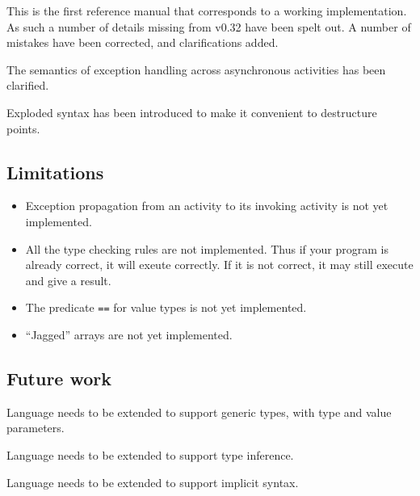 
This is the first reference manual that corresponds to a working
implementation. As such a number of details missing from v0.32 have
been spelt out. A number of mistakes have been corrected, and
clarifications added.

The semantics of exception handling across asynchronous activities has
been clarified.

Exploded syntax has been introduced to make it convenient to
destructure points. 

\subsection{Limitations}

\begin{itemize}
\item Exception propagation from an activity to its invoking activity is not
yet implemented.

\item All the type checking rules are not implemented. Thus if your program
is already correct, it will exeute correctly. If it is not correct, it
may still execute and give a result.

\item The predicate {\tt ==} for value types is not yet implemented.

\item ``Jagged'' arrays are not yet implemented.
\end{itemize}

\subsection{Future work}

Language needs to be extended to support generic types, with
type and value parameters.

Language needs to be extended to support type inference.

Language needs to be extended to support implicit syntax.